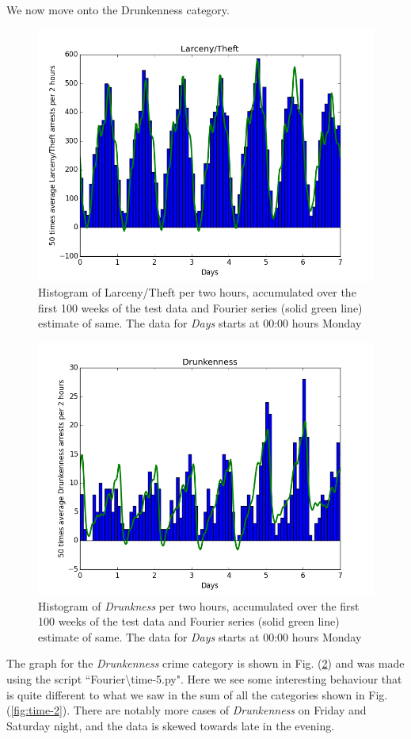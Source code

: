 \documentclass[12pt,notitlepage]{article}
\begin{document}
We now move onto the Drunkenness category. 
%
\begin{figure}
\centering{}\includegraphics[scale=0.7]{time-4}\caption{ Histogram of Larceny/Theft per two hours, accumulated over the first 100 weeks of the test data 
and Fourier series (solid green line) estimate of same. The data for \emph{Days} starts at 00:00 hours Monday\label{fig:time-4}}
\end{figure}
%
%
\begin{figure}
\centering{}\includegraphics[scale=0.7]{time-5}\caption{ Histogram of \emph{Drunkness} per two hours, accumulated over the first 100 weeks of the test 
data and Fourier series (solid green line) estimate of same. The data for \emph{Days} starts at 00:00 hours Monday\label{fig:time-5}}
\end{figure}
%
The graph for the \emph{Drunkenness} crime category is shown in Fig. (\ref{fig:time-5}) and was made using the script ``Fourier\textbackslash time-5.py". Here we see some interesting behaviour that is quite different to what we saw in the sum of all the categories shown in Fig. (\ref{fig:time-2}). There are notably more cases of \emph{Drunkenness} on Friday and Saturday night, and the data is skewed towards late in the evening. 
\end{document}
